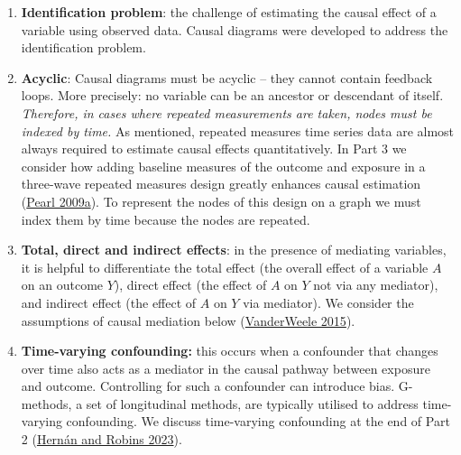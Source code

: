 \documentclass[
  singlecolumn]{article}
\begin{document}
\begin{enumerate}
\def\labelenumi{\arabic{enumi}.}
\setcounter{enumi}{12}
\item
  \textbf{Identification problem}: the challenge of estimating the
  causal effect of a variable using observed data. Causal diagrams were
  developed to address the identification problem.
\item
  \textbf{Acyclic}: Causal diagrams must be acyclic -- they cannot
  contain feedback loops. More precisely: no variable can be an ancestor
  or descendant of itself. \emph{Therefore, in cases where repeated
  measurements are taken, nodes must be indexed by time.} As mentioned,
  repeated measures time series data are almost always required to
  estimate causal effects quantitatively. In Part 3 we consider how
  adding baseline measures of the outcome and exposure in a three-wave
  repeated measures design greatly enhances causal estimation
  (\protect\hyperlink{ref-pearl2009}{Pearl 2009a}). To represent the
  nodes of this design on a graph we must index them by time because the
  nodes are repeated.
\item
  \textbf{Total, direct and indirect effects}: in the presence of
  mediating variables, it is helpful to differentiate the total effect
  (the overall effect of a variable \(A\) on an outcome \(Y\)), direct
  effect (the effect of \(A\) on \(Y\) not via any mediator), and
  indirect effect (the effect of \(A\) on \(Y\) via mediator). We
  consider the assumptions of causal mediation below
  (\protect\hyperlink{ref-vanderweele2015}{VanderWeele 2015}).
\item
  \textbf{Time-varying confounding:} this occurs when a confounder that
  changes over time also acts as a mediator in the causal pathway
  between exposure and outcome. Controlling for such a confounder can
  introduce bias. G-methods, a set of longitudinal methods, are
  typically utilised to address time-varying confounding. We discuss
  time-varying confounding at the end of Part 2
  (\protect\hyperlink{ref-hernuxe1n2023}{Hernán and Robins 2023}).
\end{enumerate}
\end{document}
